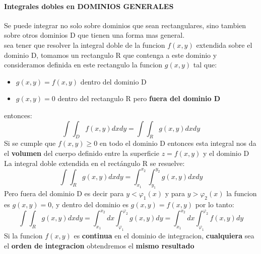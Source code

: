 \documentclass[11pt]{article}
\begin{document}
\paragraph{Integrales dobles en DOMINIOS GENERALES}
Se puede integrar no solo sobre dominios que sean rectangulares, sino tambien sobre otros dominios D que tienen una forma mas general.\\
sea tener que resolver la integral doble de la funcion $f(x, y)$ extendida sobre el dominio D, tomamos un rectangulo R que contenga a este dominio y consideramos definida en este rectangulo la funcion $g(x, y)$ tal que:
\begin{itemize}
	\item $g(x, y) = f(x, y)$ dentro del dominio D
	\item $g(x, y) = 0$ dentro del rectangulo R pero \textbf{fuera del dominio D}
\end{itemize}
entonces:
\begin{equation*}
	\int \int_D f(x, y)dxdy = \int \int_R g(x, y)dxdy
\end{equation*}
Si se cumple que $f(x, y) \geq 0$ en todo el dominio D entonces esta integral nos da el \textbf{volumen} del cuerpo definido entre la superficie $z = f(x, y)$ y el dominio D\\
\linebreak
La integral doble extendida en el rectángulo R se resuelve:
\begin{equation*}
	\int \int_R g(x, y)dxdy = \int_{x_1}^{x_2} \int_{y_1}^{y_2} g(x, y)dxdy
\end{equation*}
Pero fuera del dominio D es decir para $y < \varphi_1(x)$ y para $y > \varphi_2(x)$ la funcion es $g(x, y) = 0$, y dentro del dominio es $g(x, y) = f(x, y)$ por lo tanto:
\begin{equation*}
	\int \int_R g(x, y)dxdy = \int_{x_1}^{x_2} dx \int_{\varphi_1}^{\varphi_2} g(x, y)dy = \int_{x_1}^{x_2} dx \int_{\varphi_1}^{\varphi_2} f(x, y)dy
\end{equation*}
Si la funcion $f(x, y)$ es \textbf{continua} en el dominio de integracion, \textbf{cualquiera} sea el \textbf{orden de integracion} obtendremos el \textbf{mismo resultado}
\end{document}
